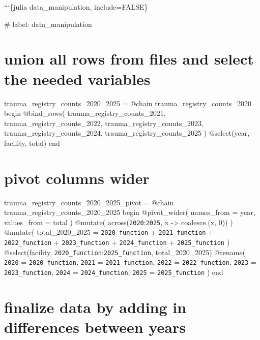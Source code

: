 \documentclass[
  12pt,
  letterpaper,
  DIV=11,
  numbers=noendperiod]{scrartcl}
\begin{document}
```\{julia data\_manipulation, include=FALSE\}

\#\textbar{} label: data\_manipulation

\section{union all rows from files and select the needed
variables}\label{union-all-rows-from-files-and-select-the-needed-variables}

trauma\_registry\_counts\_2020\_2025 = @chain
trauma\_registry\_counts\_2020 begin @bind\_rows(
trauma\_registry\_counts\_2021, trauma\_registry\_counts\_2022,
trauma\_registry\_counts\_2023, trauma\_registry\_counts\_2024,
trauma\_registry\_counts\_2025 ) @select(year, facility, total) end

\section{pivot columns wider}\label{pivot-columns-wider}

trauma\_registry\_counts\_2020\_2025\_pivot = @chain
trauma\_registry\_counts\_2020\_2025 begin @pivot\_wider( names\_from =
year, values\_from = total ) @mutate(
across(\texttt{2020}:\texttt{2025}, x -\textgreater{} coalesce.(x, 0)) )
@mutate( total\_2020\_2025 = \texttt{2020\_function} +
\texttt{2021\_function} + \texttt{2022\_function} +
\texttt{2023\_function} + \texttt{2024\_function} +
\texttt{2025\_function} ) @select(facility,
\texttt{2020\_function}:\texttt{2025\_function}, total\_2020\_2025)
@rename( \texttt{2020} = \texttt{2020\_function}, \texttt{2021} =
\texttt{2021\_function}, \texttt{2022} = \texttt{2022\_function},
\texttt{2023} = \texttt{2023\_function}, \texttt{2024} =
\texttt{2024\_function}, \texttt{2025} = \texttt{2025\_function} ) end

\section{finalize data by adding in differences between
years}\label{finalize-data-by-adding-in-differences-between-years}
\end{document}
